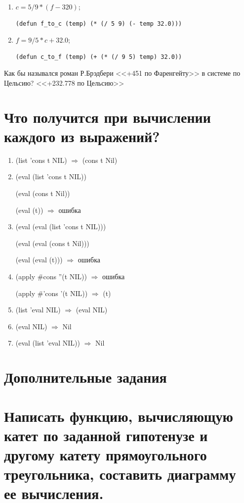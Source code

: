 \begin{enumerate}
	\item $c = 5/9*(f-320)$;
	\begin{lstlisting}[caption=Перевод из Фаренгейт в Цельсий.]
	(defun f_to_c (temp) (* (/ 5 9) (- temp 32.0)))
	\end{lstlisting}
	
	\item $f = 9/5*c+32.0$;
	\begin{lstlisting}[caption=Перевод из Цельсия в Фаренгейт.]
	(defun c_to_f (temp) (+ (* (/ 9 5) temp) 32.0))
	\end{lstlisting}
\end{enumerate}

Как бы назывался роман Р.Брэдбери <<+451 по Фаренгейту>> в системе по Цельсию? 
<<+232.778 по Цельсию>>

\newpage
\section{Что получится при вычислении каждого из выражений?}
\begin{enumerate}
	\item (list 'cons t NIL) $\Rightarrow$ (cons t Nil)
	\item (eval (list 'cons t NIL))
	
	(eval (cons t Nil)) 
	
	(eval (t)) $\Rightarrow$ ошибка
	
	\item (eval (eval (list 'cons t NIL)))
	
	(eval (eval (cons t Nil)))
	
	(eval (eval (t))) $\Rightarrow$ ошибка
	
	\item (apply \#cons ''(t NIL)) $\Rightarrow$ ошибка
	
	(apply \#'cons '(t NIL)) $\Rightarrow$ (t)
	
	\item (list 'eval NIL) $\Rightarrow$ (eval NIL)
	\item (eval NIL) $\Rightarrow$ Nil
	\item (eval (list 'eval NIL)) $\Rightarrow$ Nil
\end{enumerate}

\newpage
\section*{Дополнительные задания}
\section{Написать функцию, вычисляющую катет по заданной гипотенузе и другому катету прямоугольного треугольника, составить диаграмму ее вычисления.}

